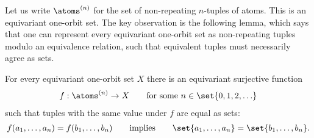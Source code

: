  Let us write $\atoms^{(n)}$ for the set of non-repeating $n$-tuples of atoms. This is an equivariant one-orbit set. The key observation is the following lemma, which says that one can represent every equivariant one-orbit set as non-repeating tuples modulo an equivalence relation, such that equivalent tuples must necessarily agree as sets. 

\begin{lemma}\label{lem:tuple-as-set}
 For every equivariant one-orbit set $X$ there is an equivariant surjective function
 \begin{align*}
 f : \atoms^{(n)} \to X \qquad \text{for some $n \in \set{0,1,2,\ldots}$}
 \end{align*}
 such that tuples with the same value under $f$ are equal as sets:
 \begin{align*}
 f(a_1,\ldots,a_n) = f(b_1,\ldots,b_n) \qquad \text{implies} \qquad \set{a_1,\ldots,a_n}= \set{b_1,\ldots,b_n}.
 \end{align*}
\end{lemma}
